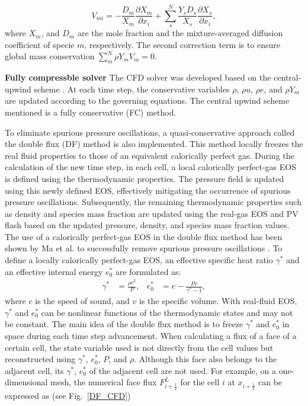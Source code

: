 $$ V_{mi} = -\frac{D_m}{X_m}\frac{\partial X_m} {\partial x_i} + \sum^{N}_{s}\frac{Y_s D_s}{X_s}\frac{\partial X_s} {\partial x_i},$$
where $X_m$, and $D_m$ are the mole fraction and the mixture-averaged diffusion coefficient of specie $m$, respectively. The second correction term is to ensure global mass conservation $\sum^{N}_{m} \rho Y_m V_m = 0$.

\textbf{Fully compressble solver}
The CFD solver was developed based on the central-upwind scheme \cite{kurganov2001semidiscrete,greenshields2010implementation}. At each time step, the conservative variables $\rho$, $\rho u$, $\rho e$, and $\rho Y_m$ are updated according to the governing equations. The central upwind scheme mentioned is a fully conservative (FC) method. 

To eliminate spurious pressure oscillations, a quasi-conservative approach called the double flux (DF) method \cite{abgrall2001computations,billet2003adaptive,ma2017entropy} is also implemented.
This method locally freezes the real fluid properties to those of an equivalent calorically perfect gas. During the calculation of the new time step, in each cell, a local calorically perfect-gas EOS is defined using the thermodynamic properties. The pressure field is updated using this newly defined EOS, effectively mitigating the occurrence of spurious pressure oscillations. Subsequently, the remaining thermodynamic properties such as density and species mass fraction are updated using the real-gas EOS and PV flash based on the updated pressure, density, and species mass fraction values. The use of a calorically perfect-gas EOS in the double flux method has been shown by Ma et al. to successfully remove spurious pressure oscillations \cite{ma2017entropy}. To define a locally calorically perfect-gas EOS, an effective specific heat ratio $\gamma^*$ and an effective internal energy $e_0^*$  are formulated as:
\begin{align}
\gamma^*& = \frac{\rho c^2}{P},&e_0^*&= e-\frac{Pv}{\gamma^*-1},
\end{align}
where $c$ is the speed of sound, and $v$ is the specific volume. %
With real-fluid EOS, $\gamma^*$ and $e_0^*$ can be nonlinear functions of the thermodynamic states and may not be constant. The main idea of the double flux method is to freeze $\gamma^*$ and $e_0^*$ in space during each time step advancement. When calculating a flux of a face of a certain cell, the state variable used is not directly from the cell values but reconstructed using $\gamma^*$, $e_0^*$, $P$, and $\rho$. Although this face also belongs to the adjacent cell, its $\gamma^*$, $e_0^*$ of the adjacent cell are not used.  For example, on a one-dimensional mesh, the numerical face flux $F^L_{i+\frac{1}{2}}$ for the cell $i$ at $x_{i+\frac{1}{2}}$ can be expressed as (see Fig.~\ref{DF_CFD})
